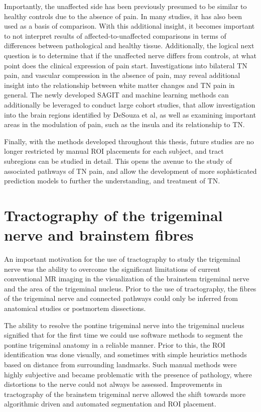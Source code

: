 Importantly, the unaffected side has been previously presumed to be similar to healthy controls due to the absence of pain. In many studies, it has also been used as a basis of comparison. With this additional insight, it becomes important to not interpret results of affected-to-unaffected comparisons in terms of differences between pathological and healthy tissue. Additionally, the logical next question is to determine that if the unaffected nerve differs from controls, at what point does the clinical expression of pain start. Investigations into bilateral TN pain, and vascular compression in the absence of pain, may reveal additional insight into the relationship between white matter changes and TN pain in general. The newly developed SAGIT and machine learning methods can additionally be leveraged to conduct large cohort studies, that allow investigation into the brain regions identified by DeSouza et al, as well as examining important areas in the modulation of pain, such as the insula and its relationship to TN. 

Finally, with the methods developed throughout this thesis, future studies are no longer restricted by manual ROI placements for each subject, and tract subregions can be studied in detail. This opens the avenue to the study of associated pathways of TN pain, and allow the development of more sophisticated prediction models to further the understanding, and treatment of TN. 

\section{Tractography of the trigeminal nerve and brainstem fibres}

An important motivation for the use of tractography to study the trigeminal nerve was the ability to overcome the significant limitations of current conventional MR imaging in the visualization of the brainstem trigeminal nerve and the area of the trigeminal nucleus. Prior to the use of tractography, the fibres of the trigeminal nerve and connected pathways could only be inferred from anatomical studies or postmortem dissections. 

The ability to resolve the pontine trigeminal nerve into the trigeminal nucleus signified that for the first time we could use software methods to segment the pontine trigeminal anatomy in a reliable manner. Prior to this, the ROI identification was done visually, and sometimes with simple heuristics methods based on distance from surrounding landmarks. Such manual methods were highly subjective and became problematic with the presence of pathology, where distortions to the nerve could not always be assessed. Improvements in tractography of the brainstem trigeminal nerve allowed the shift towards more algorithmic driven and automated segmentation and ROI placement.

